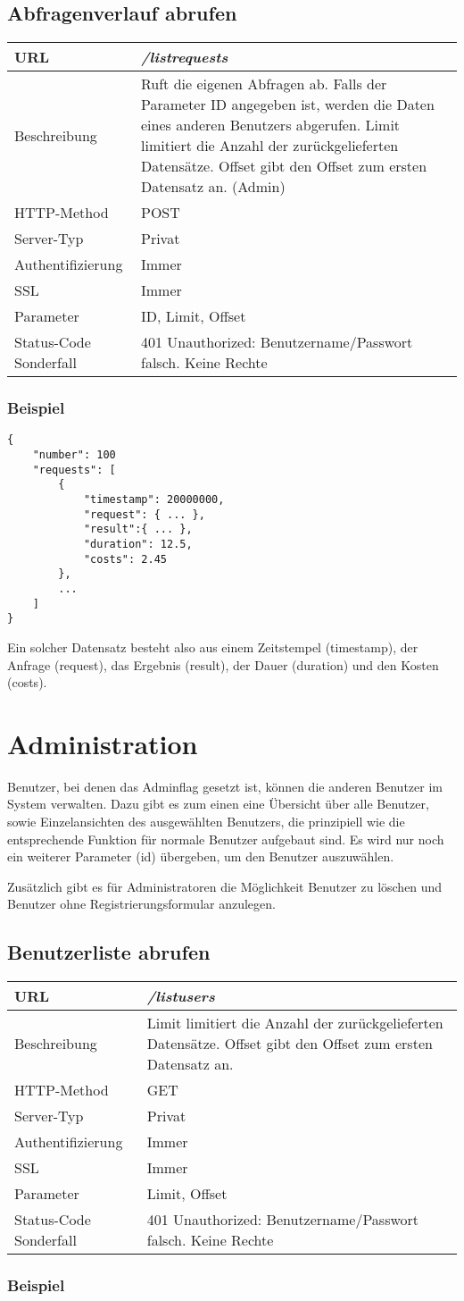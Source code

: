 \documentclass[ngerman,titlepage,parskip=true]{scrartcl}
\newcommand{\requestURL}[1]{\textit{#1}}
\newcommand{\request}[9]
{\subsection{#1}
\begin{tabular}{|p{0.2\textwidth}|p{0.7\textwidth}|}
\hline
  URL & \requestURL{#2}\\\hline
    Beschreibung & #3\\\hline
  HTTP-Method & #4\\\hline
  Server-Typ & #5\\\hline
  Authentifizierung & #6\\\hline
  SSL & #7\\\hline
  Parameter & #8\\\hline
  Status-Code Sonderfall & #9\\\hline
 \end{tabular}\vspace*{1em}}
{}%
{}%
{}%
{}%
{}%
{}%
{}%
{}%
\begin{document}
\request{Abfragenverlauf abrufen}%
{/listrequests}%
{Ruft die eigenen Abfragen ab. Falls der Parameter ID angegeben ist, werden die Daten eines anderen Benutzers abgerufen. Limit limitiert die Anzahl der zurückgelieferten Datensätze. Offset gibt den Offset zum ersten Datensatz an. (Admin)}%
{POST}%
{Privat}%
{Immer}%
{Immer}%
{ID, Limit, Offset}%
{401 Unauthorized: Benutzername/Passwort falsch. Keine Rechte}%
	
\subsubsection{Beispiel}		
		\begin{lstlisting}
{
	"number": 100
	"requests": [
		{
			"timestamp": 20000000,
			"request": { ... },
			"result":{ ... },
			"duration": 12.5,
			"costs": 2.45
		},
		...
	]
}
		\end{lstlisting}
		
		Ein solcher Datensatz besteht also aus einem Zeitstempel (timestamp), der Anfrage (request), das Ergebnis (result), der Dauer (duration) und den Kosten (costs).
	

\section{Administration}

Benutzer, bei denen das Adminflag gesetzt ist, können die anderen Benutzer im System verwalten. 
Dazu gibt es zum einen eine Übersicht über alle Benutzer, sowie Einzelansichten des ausgewählten Benutzers, die prinzipiell wie die entsprechende Funktion für normale Benutzer aufgebaut sind.
Es wird nur noch ein weiterer Parameter (id) übergeben, um den Benutzer auszuwählen.

Zusätzlich gibt es für Administratoren die Möglichkeit Benutzer zu löschen und Benutzer ohne Registrierungsformular anzulegen.

\request{Benutzerliste abrufen}%
{/listusers}%
{Limit limitiert die Anzahl der zurückgelieferten Datensätze. Offset gibt den Offset zum ersten Datensatz an.}%
{GET}%
{Privat}%
{Immer}%
{Immer}%
{Limit, Offset}%
{401 Unauthorized: Benutzername/Passwort falsch. Keine Rechte}%
\subsubsection{Beispiel}
\clearpage
\end{document}
